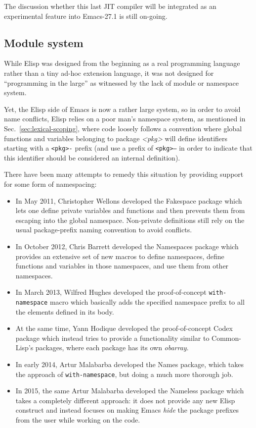 \documentclass[format=acmsmall, review=false, screen=true]{acmart}
\newcommand \Elisp {Elisp}
\begin{document}
The discussion whether this last JIT compiler will be integrated as an
experimental feature into Emacs-27.1 is still on-going.

\subsection{Module system}

While \Elisp{} was designed from the beginning as a real programming
language rather than a tiny ad-hoc extension language, it was not designed
for ``programming in the large'' as witnessed by the lack of module or
namespace system.

Yet, the \Elisp{} side of Emacs is now a rather large system, so in order to
avoid name conflicts, \Elisp{} relies on a poor man's namespace system, as
mentioned in Sec.~\ref{sec:lexical-scoping}, where code loosely follows
a convention where global functions and variables belonging to package
\textsl{<pkg>} will define identifiers starting with a \texttt{<pkg>-}
prefix (and use a prefix of \texttt{<pkg>--} in order to indicate that this
identifier should be considered an internal definition).

There have been many attempts to remedy this situation by providing support
for some form of namespacing:
\begin{itemize}
\item In May 2011, Christopher Wellons developed the Fakespace package which
  lets one define private variables and functions and then prevents them
  from escaping into the global namespace.  Non-private definitions still
  rely on the usual package-prefix naming convention to avoid conflicts.
\item In October 2012, Chris Barrett developed the Namespaces package which
  provides an extensive set of new macros to define namespaces, define
  functions and variables in those namespaces, and use them from
  other namespaces.
\item In March 2013, Wilfred Hughes developed the proof-of-concept
  \texttt{with-namespace} macro which basically adds the specified namespace
  prefix to all the elements defined in its body.
\item At the same time, Yann Hodique developed the proof-of-concept Codex
  package which instead tries to provide a functionality similar to
  Common-Lisp's packages, where each package has its own \emph{obarray}.
\item In early 2014, Artur Malabarba developed the Names package, which
  takes the approach of \texttt{with-namespace}, but doing a much more
  thorough job.
\item In 2015, the same Artur Malabarba developed the Nameless package which
  takes a completely different approach: it does not provide any new
  \Elisp{} construct and instead focuses on making Emacs \emph{hide} the
  package prefixes from the user while working on the code.
\end{itemize}
\end{document}
